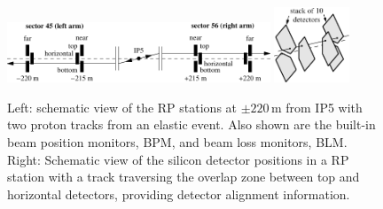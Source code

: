 \begin{figure}
\begin{center}
\includegraphics[width=0.7\textwidth]{fig/elastic_principle.pdf}
\includegraphics[width=0.2\textwidth]{fig/stationScheme.pdf}
\caption{%
Left: schematic view of the RP stations at $\pm220\,$m from IP5 with two proton tracks from an elastic event. Also shown are the built-in beam position monitors, BPM, and beam loss monitors, BLM. Right: Schematic view of the silicon detector positions in a RP station with a track traversing the overlap zone between top and horizontal detectors, providing detector alignment information. 
}
\label{fig:rpsketch}
\end{center}
\end{figure}
